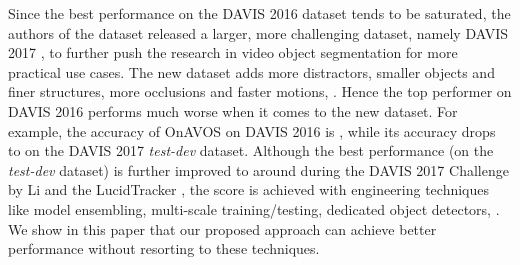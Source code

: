 \documentclass[10pt,twocolumn,letterpaper]{article}
\begin{document}
Since the best performance on the DAVIS 2016 dataset tends to be saturated, the authors of the dataset released a larger, more challenging dataset,
namely DAVIS 2017 \cite{PontTuset2017davischallenge}, to further push the research in video object segmentation for more practical use cases.
The new dataset adds more distractors, smaller objects and finer structures, more occlusions and faster motions, \etc.
Hence the top performer on DAVIS 2016 performs much worse when it comes to the new dataset. For example, the accuracy of OnAVOS \cite{voigtlaender2017online}
on DAVIS 2016 is , while its accuracy drops to  on the DAVIS 2017 \emph{test-dev} dataset.
Although the best performance (on the \emph{test-dev} dataset) is further improved to around  during the DAVIS 2017 Challenge
by Li \etal \cite{DAVIS2017-1st} and the LucidTracker \cite{DAVIS2017-2nd},
the score is achieved with engineering techniques like model ensembling, multi-scale training/testing, dedicated object detectors,
\etc.
We show in this paper that our proposed approach can achieve better performance without resorting to these techniques.
\end{document}
